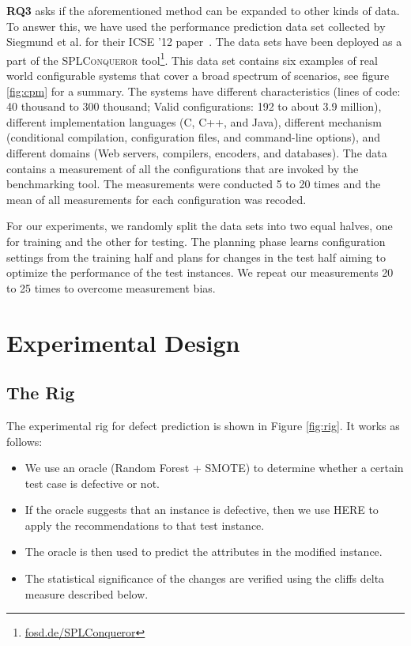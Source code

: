 \documentclass[conference]{IEEEtran}
\newcommand{\bi}{\begin{itemize}}
\newcommand{\ei}{\end{itemize}}
\begin{document}
{\bfseries RQ3} asks if the aforementioned method can be expanded to other kinds of data. To answer this, we have used the performance prediction data set collected by Siegmund et al. for their ICSE '12 paper~\cite{sven12}. The data sets have been deployed as a part of the \textsc{SPLConqueror} tool\footnote{\url{fosd.de/SPLConqueror}}. This data set contains six examples of real world configurable systems that cover a broad spectrum of scenarios, see figure \ref{fig:cpm} for a summary. The systems have different characteristics (lines of code: 40 thousand to 300 thousand; Valid configurations: 192 to about 3.9 million), different implementation languages (C, C++, and Java), different mechanism (conditional compilation, configuration files, and command-line options), and different domains (Web servers, compilers, encoders, and databases). The data contains a measurement of all the configurations that are invoked by the benchmarking tool. The measurements were conducted 5 to 20 times and the mean of all measurements for each configuration was recoded.

For our experiments, we randomly split the data sets into two equal halves, one for training and the other for testing. The planning phase learns configuration settings from the training half and plans for changes in the test half aiming to optimize the performance of the test instances. We repeat our measurements 20 to 25 times to overcome measurement bias.
\section{Experimental Design}

\subsection{The Rig}

The experimental rig for defect prediction is shown in Figure \ref{fig:rig}. It works as follows: 
\bi
\item We use an {oracle} (Random Forest + SMOTE) to determine whether a certain test case is defective or not. 
\item If the oracle suggests that an instance is defective, then we use HERE to apply the recommendations to that test instance. 
\item The oracle is then used to predict the attributes in the modified instance.
\item The statistical significance of the changes are verified using the cliffs delta measure described below.
\ei
\end{document}
